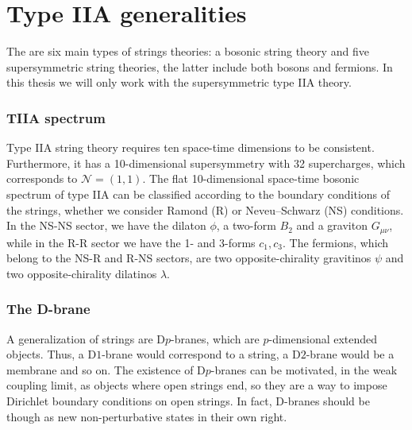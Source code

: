 \chapter{Type IIA generalities}

The are six main types of strings theories: a bosonic string theory and five supersymmetric 
string theories, the latter include both bosons and fermions.
In this thesis we will only work with the supersymmetric type IIA theory. 

\subsection{TIIA spectrum}
Type IIA string theory requires ten space-time dimensions to be consistent.
Furthermore, it has a 10-dimensional supersymmetry with 32 supercharges, which corresponds to $\mathcal N=(1,1)$.
The flat 10-dimensional space-time bosonic spectrum of type IIA can be classified according to
the boundary conditions of the strings, whether we consider Ramond (R) or Neveu–Schwarz (NS) conditions.
In the NS-NS sector, we have the dilaton $\phi$, a two-form $B_2$ and a graviton $G_{\mu\nu}$,
while in the R-R sector we have the 1- and 3-forms $c_1, c_3$.
The fermions, which belong to the NS-R and R-NS sectors, are two opposite-chirality gravitinos $\psi$ and two opposite-chirality dilatinos $\lambda$.

\subsection{The D-brane}

A generalization of strings are D$p$-branes, which are $p$-dimensional extended objects.
Thus, a D$1$-brane would correspond to a string, a D$2$-brane would be a membrane and so on.
The existence of D$p$-branes can be motivated, in the weak coupling limit, as 
objects where open strings end, so they are a way to impose Dirichlet boundary conditions on open strings.
In fact, D-branes should be though as new non-perturbative states in their own right.

